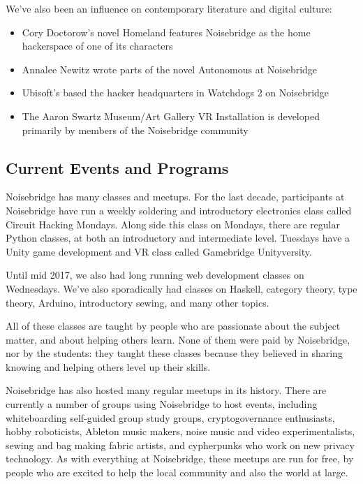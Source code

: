 \documentclass[12pt]{article}
\begin{document}
\vspace{0.5em}

We've also been an influence on contemporary literature and digital culture:

\vspace{0.5em}

\begin{itemize}
    \item Cory Doctorow's novel Homeland features Noisebridge as the home hackerspace of one of its characters
    \item Annalee Newitz wrote parts of the novel Autonomous at Noisebridge
    \item Ubisoft's based the hacker headquarters in Watchdogs 2 on Noisebridge
    \item The Aaron Swartz Museum/Art Gallery VR Installation is developed primarily by members of the Noisebridge community
\end{itemize}



\subsection{Current Events and Programs}

Noisebridge has many classes and meetups. For the last decade, participants at Noisebridge have run a weekly soldering and introductory electronics class called Circuit Hacking Mondays. Along side this class on Mondays, there are regular Python classes, at both an introductory and intermediate level. Tuesdays have a Unity game development and VR class called Gamebridge Unityversity.

Until mid 2017, we also had long running web development classes on Wednesdays. We've also sporadically had classes on Haskell, category theory, type theory, Arduino, introductory sewing, and many other topics.

All of these classes are taught by people who are passionate about the subject matter, and about helping others learn. None of them were paid by Noisebridge, nor by the students: they taught these classes because they believed in sharing knowing and helping others level up their skills.

Noisebridge has also hosted many regular meetups in its history. There are currently a number of groups using Noisebridge to host events, including whiteboarding self-guided group study groups, cryptogovernance enthusiasts, hobby roboticists, Ableton music makers, noise music and video experimentalists, sewing and bag making fabric artists, and cypherpunks who work on new privacy technology. As with everything at Noisebridge, these meetups are run for free, by people who are excited to help the local community and also the world at large.
\end{document}
